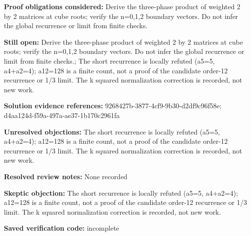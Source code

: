 \documentclass[11pt]{article}
\begin{document}
\textbf{Proof obligations considered:} Derive the three-phase product of weighted 2 by 2 matrices at cube roots; verify the n=0,1,2 boundary vectors. Do not infer the global recurrence or limit from finite checks.\par
\textbf{Still open:} Derive the three-phase product of weighted 2 by 2 matrices at cube roots; verify the n=0,1,2 boundary vectors. Do not infer the global recurrence or limit from finite checks.; The short recurrence is locally refuted (a5=5, a4+a2=4); a12=128 is a finite count, not a proof of the candidate order-12 recurrence or 1/3 limit. The k squared normalization correction is recorded, not new work.\par
\textbf{Solution evidence references:} 9268427b-3877-4cf9-9b30-d2df9c96f58e; d4aa124d-f59a-497a-ae37-1b170c2961fa\par
\textbf{Unresolved objections:} The short recurrence is locally refuted (a5=5, a4+a2=4); a12=128 is a finite count, not a proof of the candidate order-12 recurrence or 1/3 limit. The k squared normalization correction is recorded, not new work.\par
\textbf{Resolved review notes:} None recorded\par
\textbf{Skeptic objection:} The short recurrence is locally refuted (a5=5, a4+a2=4); a12=128 is a finite count, not a proof of the candidate order-12 recurrence or 1/3 limit. The k squared normalization correction is recorded, not new work.\par
\textbf{Saved verification code:} incomplete\par
\end{document}
